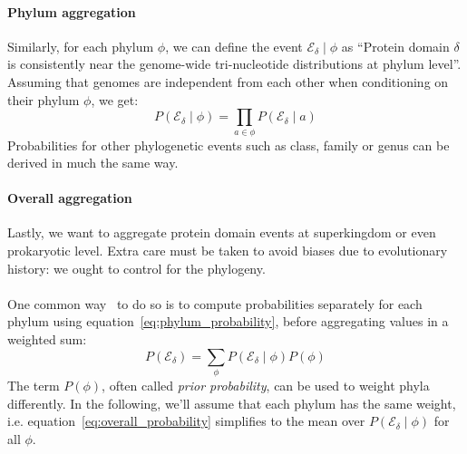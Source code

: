 \documentclass[12pt]{article}
\begin{document}
\paragraph{Phylum aggregation}
Similarly, for each phylum $\phi$, we can define the event $\mathscr{E_{\delta}} \mid \phi$ as ``Protein domain $\delta$ is consistently near the genome-wide tri-nucleotide distributions at phylum level''. Assuming that genomes are independent from each other when conditioning on their phylum $\phi$, we get:
%
\begin{equation}
P(\mathscr{E_{\delta}} \mid \phi) = \prod\limits_{a \in \phi} P(\mathscr{E_{\delta}} \mid a)
\label{eq:phylum_probability}
\end{equation}
%
Probabilities for other phylogenetic events such as class, family or genus can be derived in much the same way.

\paragraph{Overall aggregation}
Lastly, we want to aggregate protein domain events at superkingdom or even prokaryotic level. Extra care must be taken to avoid biases due to evolutionary history: we ought to control for the phylogeny.\\
\\
One common way~\cite{greenland1999confounding} to do so is to compute probabilities separately for each phylum using equation~\ref{eq:phylum_probability}, before aggregating values in a weighted sum:
%
\begin{equation}
P(\mathscr{E_{\delta}}) = \sum\limits_{\phi} P(\mathscr{E_{\delta}} \mid \phi)P(\phi)
\label{eq:overall_probability}
\end{equation}
%
The term $P(\phi)$, often called \textit{prior probability}, can be used to weight phyla differently. In the following, we'll assume that each phylum has the same weight, i.e. equation~\ref{eq:overall_probability} simplifies to the mean over $P(\mathscr{E_{\delta}} \mid \phi)$ for all $\phi$.
\end{document}
